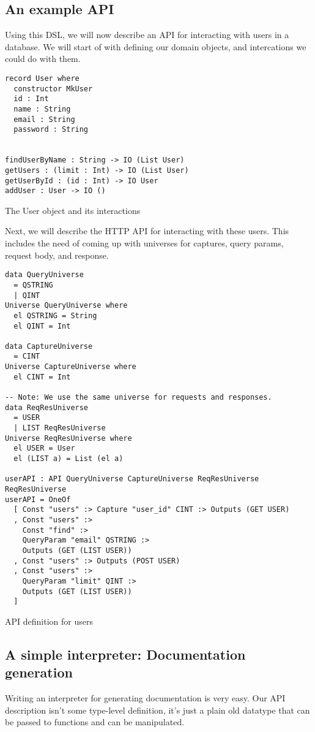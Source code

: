 \documentclass[12pt,a4paper]{article}
\begin{document}
\subsection{An example API}
Using this DSL, we will now describe an API for interacting with users in a database.
We will start of with defining our domain objects, and intercations we could do with them.

\begin{listing}
\begin{verbatim}
record User where
  constructor MkUser
  id : Int
  name : String
  email : String
  password : String


findUserByName : String -> IO (List User)
getUsers : (limit : Int) -> IO (List User)
getUserById : (id : Int) -> IO User
addUser : User -> IO ()
\end{verbatim}
\label{domain}
\caption{The User object and its interactions}
\end{listing}

Next, we will describe the HTTP API for interacting with these users.  This includes
the need of coming up with universes for captures, query params, request body, and response.

\begin{listing}
\begin{verbatim}
data QueryUniverse
  = QSTRING
  | QINT
Universe QueryUniverse where
  el QSTRING = String
  el QINT = Int

data CaptureUniverse
  = CINT
Universe CaptureUniverse where
  el CINT = Int

-- Note: We use the same universe for requests and responses.
data ReqResUniverse
  = USER
  | LIST ReqResUniverse
Universe ReqResUniverse where
  el USER = User
  el (LIST a) = List (el a)

userAPI : API QueryUniverse CaptureUniverse ReqResUniverse ReqResUniverse
userAPI = OneOf
  [ Const "users" :> Capture "user_id" CINT :> Outputs (GET USER)
  , Const "users" :>
    Const "find" :>
    QueryParam "email" QSTRING :>
    Outputs (GET (LIST USER))
  , Const "users" :> Outputs (POST USER)
  , Const "users" :>
    QueryParam "limit" QINT :>
    Outputs (GET (LIST USER))
  ]
\end{verbatim}
\label{code:api}
\caption{API definition for users}
\end{listing}

\subsection{A simple interpreter: Documentation generation}
Writing an interpreter for generating documentation is very easy. Our API description isn't some type-level definition, it's just a plain old datatype that can be passed to functions and can be manipulated.
\end{document}
